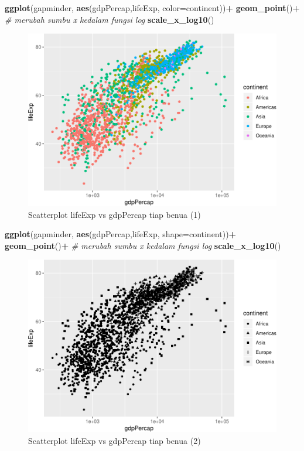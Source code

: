 \documentclass[]{book}
\newenvironment{Shaded}{\begin{snugshade}}{\end{snugshade}}
\newcommand{\KeywordTok}[1]{\textcolor[rgb]{0.13,0.29,0.53}{\textbf{#1}}}
\newcommand{\DataTypeTok}[1]{\textcolor[rgb]{0.13,0.29,0.53}{#1}}
\newcommand{\StringTok}[1]{\textcolor[rgb]{0.31,0.60,0.02}{#1}}
\newcommand{\CommentTok}[1]{\textcolor[rgb]{0.56,0.35,0.01}{\textit{#1}}}
\newcommand{\OperatorTok}[1]{\textcolor[rgb]{0.81,0.36,0.00}{\textbf{#1}}}
\newcommand{\NormalTok}[1]{#1}
\begin{document}
\begin{Shaded}
\begin{Highlighting}[]
\KeywordTok{ggplot}\NormalTok{(gapminder, }\KeywordTok{aes}\NormalTok{(gdpPercap,lifeExp, }\DataTypeTok{color=}\NormalTok{continent))}\OperatorTok{+}
\StringTok{  }\KeywordTok{geom_point}\NormalTok{()}\OperatorTok{+}
\StringTok{  }\CommentTok{# merubah sumbu x kedalam fungsi log}
\StringTok{  }\KeywordTok{scale_x_log10}\NormalTok{()}
\end{Highlighting}
\end{Shaded}

\begin{figure}

{\centering \includegraphics[width=0.7\linewidth]{EnvStat_files/figure-latex/ggscatter2-1} 

}

\caption{Scatterplot lifeExp vs gdpPercap tiap benua (1)}\label{fig:ggscatter2}
\end{figure}

\begin{Shaded}
\begin{Highlighting}[]
\KeywordTok{ggplot}\NormalTok{(gapminder, }\KeywordTok{aes}\NormalTok{(gdpPercap,lifeExp, }\DataTypeTok{shape=}\NormalTok{continent))}\OperatorTok{+}
\StringTok{  }\KeywordTok{geom_point}\NormalTok{()}\OperatorTok{+}
\StringTok{  }\CommentTok{# merubah sumbu x kedalam fungsi log}
\StringTok{  }\KeywordTok{scale_x_log10}\NormalTok{()}
\end{Highlighting}
\end{Shaded}

\begin{figure}

{\centering \includegraphics[width=0.7\linewidth]{EnvStat_files/figure-latex/ggscatter3-1} 

}

\caption{Scatterplot lifeExp vs gdpPercap tiap benua (2)}\label{fig:ggscatter3}
\end{figure}
\end{document}
